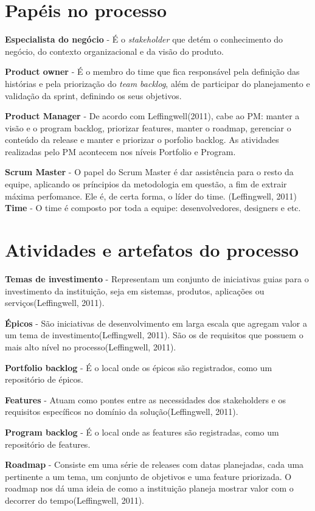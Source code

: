 \section{Papéis no processo}
\textbf{Especialista do negócio} - É o \textit{stakeholder} que detém o conhecimento do negócio, do contexto organizacional e da visão do produto.

\textbf{Product owner} - É o membro do time que fica responsável pela definição das histórias e pela priorização do 
\textit{team backlog}, além de participar do planejamento e validação da sprint, definindo os seus objetivos.

\textbf{Product Manager} - De acordo com Leffingwell(2011), cabe ao PM: manter a visão e o program backlog, priorizar features, manter o roadmap, gerenciar o conteúdo da release e manter e priorizar o porfolio backlog. As atividades realizadas pelo PM acontecem nos níveis Portfolio e Program.

\textbf{Scrum Master} - O papel do Scrum Master é dar assistência para o resto da equipe, aplicando os príncipios da metodologia em questão, a fim de extrair máxima perfomance. Ele é, de certa forma, o líder do time. (Leffingwell, 2011)
\textbf{Time} - O time é composto por toda a equipe: desenvolvedores, designers e etc.
\section{Atividades e artefatos do processo}
\textbf{Temas de investimento} - Representam um conjunto de iniciativas guias para o investimento da instituição, seja em sistemas, produtos, aplicações ou serviços(Leffingwell, 2011).

\textbf{Épicos} - São iniciativas de desenvolvimento em larga escala que agregam valor a um tema de investimento(Leffingwell, 2011). São os de requisitos que possuem o mais alto nível no processo(Leffingwell, 2011).

\textbf{Portfolio backlog} - É o local onde os épicos são registrados, como um repositório de épicos.

\textbf{Features} - Atuam como pontes entre as necessidades dos stakeholders e os requisitos específicos no domínio da solução(Leffingwell, 2011).

\textbf{Program backlog} - É o local onde as features são registradas, como um repositório de features.

\textbf{Roadmap} - Consiste em uma série de releases com datas planejadas, cada uma pertinente a um tema, um conjunto de objetivos e uma feature priorizada. O roadmap nos dá uma ideia de como a instituição planeja mostrar valor com o decorrer do tempo(Leffingwell, 2011).

